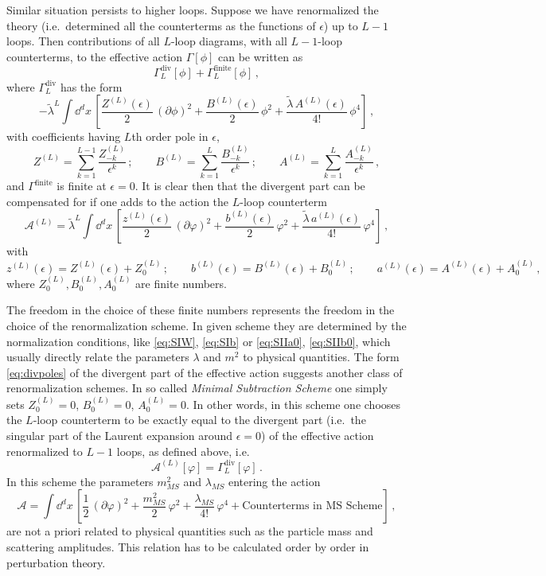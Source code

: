Similar situation persists to higher loops. Suppose we have renormalized the
theory (i.e.\ determined all the counterterms as the functions of $\epsilon$) up
to $L-1$ loops. Then contributions of all $L$-loop diagrams, with all
$L-1$-loop counterterms, to the effective action $\Gamma[\phi]$ can be written
as
\[
\Gamma^{\text{div}}_L[\phi]+\Gamma^{\text{finite}}_L[\phi]\,,
\]
where $\Gamma^{\text{div}}_L$ has the form
\[
-\tilde\lambda^L\int \dd^dx\,\left[\frac{Z^{(L)}(\epsilon)}2\,(\partial\phi)^2+\frac{B^{(L)}(\epsilon)}2\,\phi^2+\frac{\tilde\lambda\,A^{(L)}(\epsilon)}{4!}\,\phi^4\right]\,,
\]
with coefficients having $L$th order pole in $\epsilon$,
\begin{equation}\label{eq:divpoles}
Z^{(L)}=\sum_{k=1}^{L-1}\frac{Z^{(L)}_{-k}}{\epsilon^k}\,;\qquad
B^{(L)}=\sum_{k=1}^L\frac{B^{(L)}_{-k}}{\epsilon^k}\,;\qquad
A^{(L)}=\sum_{k=1}^L\frac{A^{(L)}_{-k}}{\epsilon^k}\,,
\end{equation}
and $\Gamma^{\text{finite}}$ is finite at $\epsilon=0$. It is clear then that the
divergent part can be compensated for if one adds to the action the $L$-loop
counterterm
\[
\mathcal A^{(L)}=\tilde\lambda^L\int \dd^dx\,\left[\frac{z^{(L)}(\epsilon)}2\,(\partial\varphi)^2+\frac{b^{(L)}(\epsilon)}2\,\varphi^2+\frac{\tilde\lambda\,a^{(L)}(\epsilon)}{4!}\,\varphi^4\right]\,,
\]
with
\[
z^{(L)}(\epsilon)=Z^{(L)}(\epsilon)+Z_0^{(L)}\,;\qquad
b^{(L)}(\epsilon)=B^{(L)}(\epsilon)+B_0^{(L)}\,;\qquad
a^{(L)}(\epsilon)=A^{(L)}(\epsilon)+A_0^{(L)}\,,
\]
where $Z_0^{(L)},B_0^{(L)},A_0^{(L)}$ are finite numbers.

The freedom in the choice of these finite numbers represents the freedom in the
choice of the renormalization scheme. In given scheme they are determined by the
normalization conditions, like \eqref{eq:SIW}, \eqref{eq:SIb} or
\eqref{eq:SIIa0}, \eqref{eq:SIIb0}, which usually directly relate the parameters
$\lambda$ and $m^2$ to physical quantities. The form \eqref{eq:divpoles} of the
divergent part of the effective action suggests another class of renormalization
schemes. In so called \emph{Minimal Subtraction Scheme} one simply sets
$Z_0^{(L)}=0$, $B_0^{(L)}=0$, $A_0^{(L)}=0$. In other words, in this scheme one
chooses the $L$-loop counterterm to be exactly equal to the divergent part (i.e.\
the singular part of the Laurent expansion around $\epsilon=0$) of the effective
action renormalized to $L-1$ loops, as defined above, i.e.
\[
\mathcal A^{(L)}[\varphi]=\Gamma^{\text{div}}_L[\varphi]\,.
\]
In this scheme the parameters $m^2_{MS}$ and $\lambda_{MS}$ entering the action
\[
\mathcal A=\int \dd^dx\,\left[\frac12\,(\partial\varphi)^2+\frac{m^2_{MS}}2\,\varphi^2+\frac{\lambda_{MS}}{4!}\,\varphi^4+\text{Counterterms in MS Scheme}\right]\,,
\]
are not a priori related to physical quantities such as the particle mass and
scattering amplitudes. This relation has to be calculated order by order in
perturbation theory.

